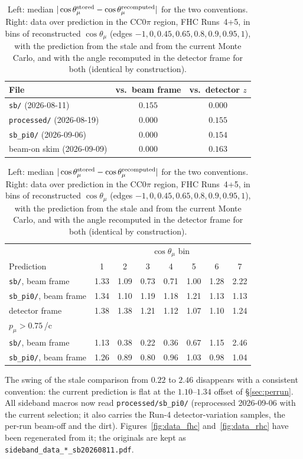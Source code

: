 \documentclass[11pt,a4paper]{article}
\newcommand{\GeVc}{\,\text{GeV}\!/c}
\begin{document}
\begin{table}[H]
  \centering
  \caption{Left: median $|\cos\theta_\mu^{\rm stored}-\cos\theta_\mu^{\rm recomputed}|$ for the two conventions.
    Right: data over prediction in the CC$0\pi$ region, FHC Runs~4+5, in bins of reconstructed $\cos\theta_\mu$
    (edges $-1,0,0.45,0.65,0.8,0.9,0.95,1$), with the prediction from the stale and from the current Monte Carlo,
    and with the angle recomputed in the detector frame for both (identical by construction).}
  \label{tab:stale_mc}
  \small
  \begin{tabular}{lcc}
    \toprule
    File & vs.\ beam frame & vs.\ detector $z$ \\
    \midrule
    \texttt{sb/} (2026-08-11) & $0.155$ & $0.000$ \\
    \texttt{processed/} (2026-08-19) & $0.000$ & $0.155$ \\
    \texttt{sb\_pi0/} (2026-09-06) & $0.000$ & $0.154$ \\
    beam-on skim (2026-09-09) & $0.000$ & $0.163$ \\
    \bottomrule
  \end{tabular}\hfill
  \begin{tabular}{lccccccc}
    \toprule
    & \multicolumn{7}{c}{$\cos\theta_\mu$ bin} \\
    Prediction & 1 & 2 & 3 & 4 & 5 & 6 & 7 \\
    \midrule
    \texttt{sb/}, beam frame & 1.33 & 1.09 & 0.73 & 0.71 & 1.00 & 1.28 & 2.22 \\
    \texttt{sb\_pi0/}, beam frame & 1.34 & 1.10 & 1.19 & 1.18 & 1.21 & 1.13 & 1.13 \\
    detector frame & 1.38 & 1.38 & 1.21 & 1.12 & 1.07 & 1.10 & 1.24 \\
    \midrule
    \multicolumn{8}{l}{$p_\mu>0.75$\GeVc} \\
    \texttt{sb/}, beam frame & 1.13 & 0.38 & 0.22 & 0.36 & 0.67 & 1.15 & 2.46 \\
    \texttt{sb\_pi0/}, beam frame & 1.26 & 0.89 & 0.80 & 0.96 & 1.03 & 0.98 & 1.04 \\
    \bottomrule
  \end{tabular}
\end{table}

The swing of the stale comparison from $0.22$ to $2.46$ disappears with a consistent convention: the current
prediction is flat at the $1.10$--$1.34$ offset of \S\ref{sec:perrun}. All sideband macros now read
\texttt{processed/sb\_pi0/} (reprocessed 2026-09-06 with the current selection; it also carries the Run-4
detector-variation samples, the per-run beam-off and the dirt). Figures~\ref{fig:data_fhc} and~\ref{fig:data_rhc}
have been regenerated from it; the originals are kept as \texttt{sideband\_data\_*\_sb20260811.pdf}.
\end{document}
